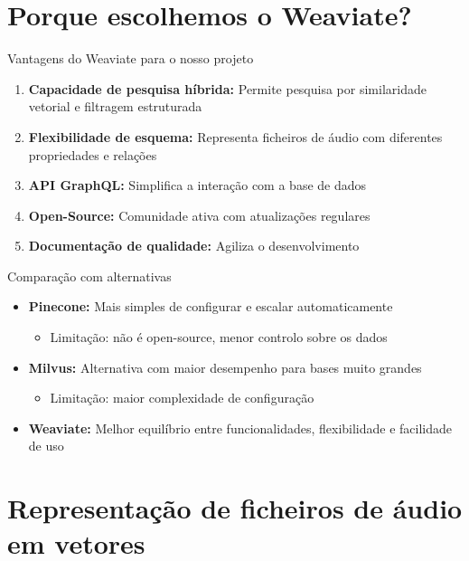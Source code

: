 \documentclass{beamer}
\begin{document}
\section{Porque escolhemos o Weaviate?}

\begin{frame}{Vantagens do Weaviate para o nosso projeto}
    \begin{enumerate}
        \item \textbf{Capacidade de pesquisa híbrida:} Permite pesquisa por similaridade vetorial e filtragem estruturada
        \item \textbf{Flexibilidade de esquema:} Representa ficheiros de áudio com diferentes propriedades e relações
        \item \textbf{API GraphQL:} Simplifica a interação com a base de dados
        \item \textbf{Open-Source:} Comunidade ativa com atualizações regulares
        \item \textbf{Documentação de qualidade:} Agiliza o desenvolvimento
    \end{enumerate}
\end{frame}

\begin{frame}{Comparação com alternativas}
    \begin{itemize}
        \item \textbf{Pinecone:} Mais simples de configurar e escalar automaticamente
        \begin{itemize}
            \item Limitação: não é open-source, menor controlo sobre os dados
        \end{itemize}
        \item \textbf{Milvus:} Alternativa com maior desempenho para bases muito grandes
        \begin{itemize}
            \item Limitação: maior complexidade de configuração
        \end{itemize}
        \item \textbf{Weaviate:} Melhor equilíbrio entre funcionalidades, flexibilidade e facilidade de uso
    \end{itemize}
\end{frame}

\section{Representação de ficheiros de áudio em vetores}
\end{document}

